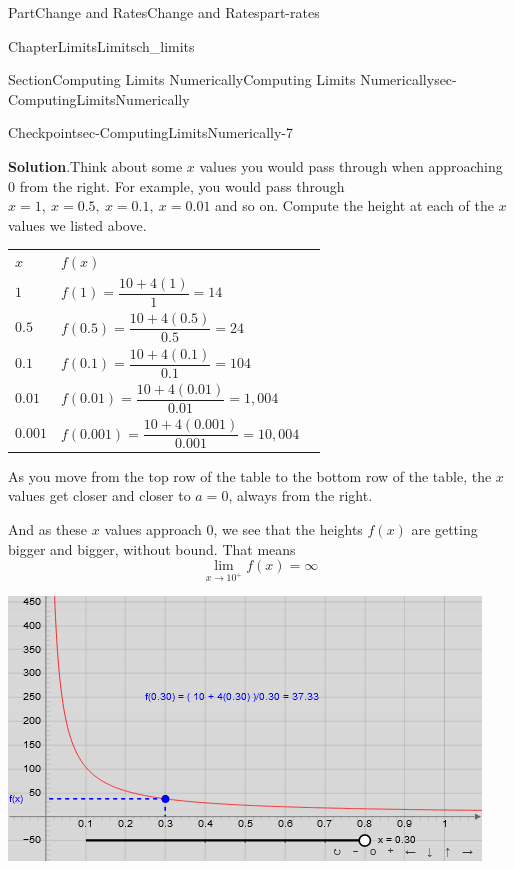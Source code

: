 \documentclass{tufte-book}
\newcommand{\blocktitlefont}{\relax}
\newcommand{\tabularfont}{\relax}
\numberwithin{equation}{chapter}
\newcommand{\hrulemedium}{\noalign{\hrule height 0.07em}}
\begin{document}
\begin{partptx}{Part}{Change and Rates}{}{Change and Rates}{}{}{part-rates}
\begin{chapterptx}{Chapter}{Limits}{}{Limits}{}{}{ch_limits}
\begin{sectionptx}{Section}{Computing Limits Numerically}{}{Computing Limits Numerically}{}{}{sec-ComputingLimitsNumerically}
\begin{inlineexercise}{Checkpoint}{}{sec-ComputingLimitsNumerically-7}
\par\smallskip%
\noindent\textbf{\blocktitlefont Solution}.\hypertarget{sec-ComputingLimitsNumerically-7-2}{}\quad{}Think about some \(x\) values you would pass through when approaching \(0\) from the right. For example, you would pass through \(x=1,\ x=0.5,\ x=0.1,\ x=0.01\) and so on. Compute the height at each of the \(x\) values we listed above. \begin{center}%
{\tabularfont%
\begin{tabular}{lBl}
\(x\)&\(f(x)\)\tabularnewline\hrulemedium
\(1\)&\(f(1) = \dfrac{10+4(1)}{1} = 14  \)\tabularnewline\hrulemedium
\(0.5\)&\(f(0.5) = \dfrac{10+4(0.5)}{0.5} = 24  \)\tabularnewline\hrulemedium
\(0.1\)&\(f(0.1) = \dfrac{10+4(0.1)}{0.1} = 104 \)\tabularnewline\hrulemedium
\(0.01\)&\(f(0.01) = \dfrac{10+4(0.01)}{0.01} = 1,004  \)\tabularnewline[0pt]
\(0.001\)&\(f(0.001) = \dfrac{10+4(0.001)}{0.001} = 10,004  \)
\end{tabular}
}%
\end{center}%
 As you move from the top row of the table to the bottom row of the table, the \(x\) values get closer and closer to \(a=0\), always from the right.%
\par
And as these \(x\) values approach 0, we see that the heights \(f(x)\) are getting bigger and bigger, without bound.  That means%
\begin{equation*}
\lim_{x\rightarrow 10^+} f(x) = \infty
\end{equation*}
%
\begin{sidebyside}{2}{0.075}{0.075}{0.17}%
\begin{sbspanel}{0.47}%
\includegraphics[width=\linewidth]{external/jsxgraph-inflimit.png}
\end{sbspanel}%
\begin{sbspanel}{0.21}%

\end{sbspanel}
\end{sidebyside}
\end{inlineexercise}
\end{sectionptx}
\end{chapterptx}
\end{partptx}
\end{document}
